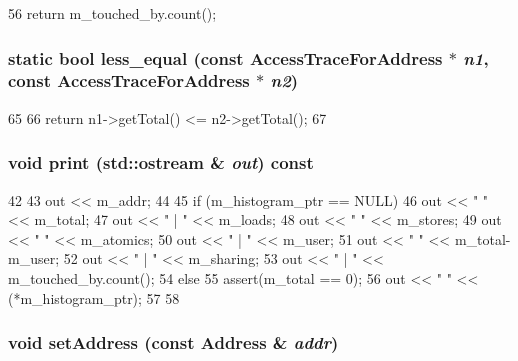 \begin{DoxyCode}
56 { return m_touched_by.count(); }
\end{DoxyCode}
\hypertarget{classAccessTraceForAddress_af4b2dcff6f65bd1bcbcc0cd9995d0d35}{
\subsubsection[{less\_\-equal}]{\setlength{\rightskip}{0pt plus 5cm}static bool less\_\-equal (const {\bf AccessTraceForAddress} $\ast$ {\em n1}, \/  const {\bf AccessTraceForAddress} $\ast$ {\em n2})}}
\label{classAccessTraceForAddress_af4b2dcff6f65bd1bcbcc0cd9995d0d35}



\begin{DoxyCode}
65     {
66         return n1->getTotal() <= n2->getTotal();
67     }
\end{DoxyCode}
\hypertarget{classAccessTraceForAddress_ac55fe386a101fbae38c716067c9966a0}{
\subsubsection[{print}]{\setlength{\rightskip}{0pt plus 5cm}void print (std::ostream \& {\em out}) const}}
\label{classAccessTraceForAddress_ac55fe386a101fbae38c716067c9966a0}



\begin{DoxyCode}
42 {
43     out << m_addr;
44 
45     if (m_histogram_ptr == NULL) {
46         out << " " << m_total;
47         out << " | " << m_loads;
48         out << " " << m_stores;
49         out << " " << m_atomics;
50         out << " | " << m_user;
51         out << " " << m_total-m_user;
52         out << " | " << m_sharing;
53         out << " | " << m_touched_by.count();
54     } else {
55         assert(m_total == 0);
56         out << " " << (*m_histogram_ptr);
57     }
58 }
\end{DoxyCode}
\hypertarget{classAccessTraceForAddress_a53120b1754f27e405338f9ab6e3408cc}{
\subsubsection[{setAddress}]{\setlength{\rightskip}{0pt plus 5cm}void setAddress (const {\bf Address} \& {\em addr})}}
\label{classAccessTraceForAddress_a53120b1754f27e405338f9ab6e3408cc}



